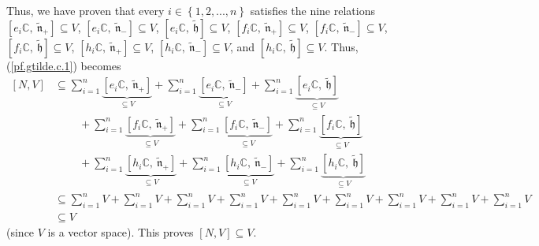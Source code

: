\documentclass[etingof-lie.tex]{subfiles}
\begin{document}
Thus, we have proven that every $i\in\left\{  1,2,...,n\right\}  $ satisfies
the nine relations $\left[  e_{i}\mathbb{C},\ \widetilde{\mathfrak{n}}%
_{+}\right]  \subseteq V$, $\left[  e_{i}\mathbb{C},\ \widetilde{\mathfrak{n}%
}_{-}\right]  \subseteq V$, $\left[  e_{i}\mathbb{C},\ \widetilde{\mathfrak{h}%
}\right]  \subseteq V$, $\left[  f_{i}\mathbb{C},\ \widetilde{\mathfrak{n}%
}_{+}\right]  \subseteq V$, $\left[  f_{i}\mathbb{C},\ \widetilde{\mathfrak{n}%
}_{-}\right]  \subseteq V$, $\left[  f_{i}\mathbb{C},\ \widetilde{\mathfrak{h}%
}\right]  \subseteq V$, $\left[  h_{i}\mathbb{C},\ \widetilde{\mathfrak{n}%
}_{+}\right]  \subseteq V$, $\left[  h_{i}\mathbb{C},\ \widetilde{\mathfrak{n}%
}_{-}\right]  \subseteq V$, and $\left[  h_{i}\mathbb{C}%
,\ \widetilde{\mathfrak{h}}\right]  \subseteq V$. Thus, (\ref{pf.gtilde.c.1})
becomes%
\begin{align*}
\left[  N,V\right]   &  \subseteq\sum\limits_{i=1}^{n}\underbrace{\left[
e_{i}\mathbb{C},\ \widetilde{\mathfrak{n}}_{+}\right]  }_{\subseteq V}%
+\sum\limits_{i=1}^{n}\underbrace{\left[  e_{i}\mathbb{C}%
,\ \widetilde{\mathfrak{n}}_{-}\right]  }_{\subseteq V}+\sum\limits_{i=1}%
^{n}\underbrace{\left[  e_{i}\mathbb{C},\ \widetilde{\mathfrak{h}}\right]
}_{\subseteq V}\\
&  \ \ \ \ \ \ \ \ \ \ +\sum\limits_{i=1}^{n}\underbrace{\left[
f_{i}\mathbb{C},\ \widetilde{\mathfrak{n}}_{+}\right]  }_{\subseteq V}%
+\sum\limits_{i=1}^{n}\underbrace{\left[  f_{i}\mathbb{C}%
,\ \widetilde{\mathfrak{n}}_{-}\right]  }_{\subseteq V}+\sum\limits_{i=1}%
^{n}\underbrace{\left[  f_{i}\mathbb{C},\ \widetilde{\mathfrak{h}}\right]
}_{\subseteq V}\\
&  \ \ \ \ \ \ \ \ \ \ +\sum\limits_{i=1}^{n}\underbrace{\left[
h_{i}\mathbb{C},\ \widetilde{\mathfrak{n}}_{+}\right]  }_{\subseteq V}%
+\sum\limits_{i=1}^{n}\underbrace{\left[  h_{i}\mathbb{C}%
,\ \widetilde{\mathfrak{n}}_{-}\right]  }_{\subseteq V}+\sum\limits_{i=1}%
^{n}\underbrace{\left[  h_{i}\mathbb{C},\ \widetilde{\mathfrak{h}}\right]
}_{\subseteq V}\\
&  \subseteq\sum\limits_{i=1}^{n}V+\sum\limits_{i=1}^{n}V+\sum\limits_{i=1}%
^{n}V+\sum\limits_{i=1}^{n}V+\sum\limits_{i=1}^{n}V+\sum\limits_{i=1}%
^{n}V+\sum\limits_{i=1}^{n}V+\sum\limits_{i=1}^{n}V+\sum\limits_{i=1}^{n}V\\
&  \subseteq V
\end{align*}
(since $V$ is a vector space). This proves $\left[  N,V\right]  \subseteq V$.
\end{document}
